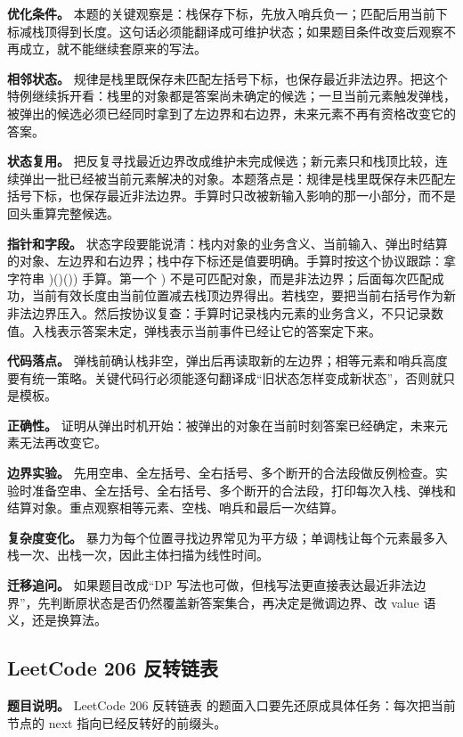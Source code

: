 \textbf{优化条件。} 本题的关键观察是：栈保存下标，先放入哨兵负一；匹配后用当前下标减栈顶得到长度。这句话必须能翻译成可维护状态；如果题目条件改变后观察不再成立，就不能继续套原来的写法。

\textbf{相邻状态。} 规律是栈里既保存未匹配左括号下标，也保存最近非法边界。把这个特例继续拆开看：栈里的对象都是答案尚未确定的候选；一旦当前元素触发弹栈，被弹出的候选必须已经同时拿到了左边界和右边界，未来元素不再有资格改变它的答案。

\textbf{状态复用。} 把反复寻找最近边界改成维护未完成候选；新元素只和栈顶比较，连续弹出一批已经被当前元素解决的对象。本题落点是：规律是栈里既保存未匹配左括号下标，也保存最近非法边界。手算时只改被新输入影响的那一小部分，而不是回头重算完整候选。

\textbf{指针和字段。} 状态字段要能说清：栈内对象的业务含义、当前输入、弹出时结算的对象、左边界和右边界；栈中存下标还是值要明确。手算时按这个协议跟踪：拿字符串 )()()) 手算。第一个 ) 不是可匹配对象，而是非法边界；后面每次匹配成功，当前有效长度由当前位置减去栈顶边界得出。若栈空，要把当前右括号作为新非法边界压入。然后按协议复查：手算时记录栈内元素的业务含义，不只记录数值。入栈表示答案未定，弹栈表示当前事件已经让它的答案定下来。

\textbf{代码落点。} 弹栈前确认栈非空，弹出后再读取新的左边界；相等元素和哨兵高度要有统一策略。关键代码行必须能逐句翻译成“旧状态怎样变成新状态”，否则就只是模板。

\textbf{正确性。} 证明从弹出时机开始：被弹出的对象在当前时刻答案已经确定，未来元素无法再改变它。

\textbf{边界实验。} 先用空串、全左括号、全右括号、多个断开的合法段做反例检查。实验时准备空串、全左括号、全右括号、多个断开的合法段，打印每次入栈、弹栈和结算对象。重点观察相等元素、空栈、哨兵和最后一次结算。

\textbf{复杂度变化。} 暴力为每个位置寻找边界常见为平方级；单调栈让每个元素最多入栈一次、出栈一次，因此主体扫描为线性时间。

\textbf{迁移追问。} 如果题目改成“DP 写法也可做，但栈写法更直接表达最近非法边界”，先判断原状态是否仍然覆盖新答案集合，再决定是微调边界、改 value 语义，还是换算法。

\subsection{LeetCode 206 反转链表}

\textbf{题目说明。} LeetCode 206 反转链表 的题面入口要先还原成具体任务：每次把当前节点的 next 指向已经反转好的前缀头。


